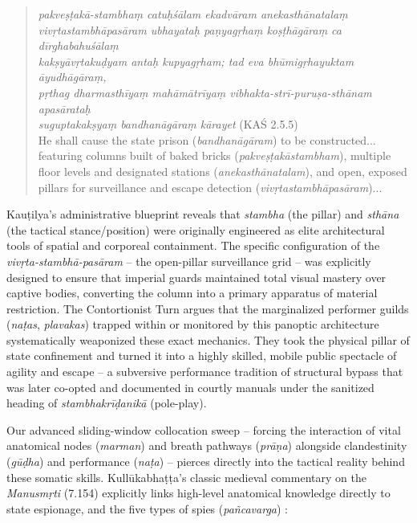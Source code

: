 \documentclass[11pt,twoside,letterpaper]{article}
\begin{document}
\begin{quote}
\textit{pakveṣṭakā-stambhaṃ catuḥśālam ekadvāram anekasthānatalaṃ \\
vivṛtastambhāpasāram ubhayataḥ paṇyagṛhaṃ koṣṭhāgāraṃ ca dīrghabahuśālaṃ\\
kakṣyāvṛtakuḍyam antaḥ kupyagṛham; tad eva bhūmigṛhayuktam āyudhāgāraṃ,\\
pṛthag dharmasthīyaṃ mahāmātrīyaṃ vibhakta-strī-puruṣa-sthānam apasārataḥ\\
suguptakakṣyaṃ bandhanāgāraṃ kārayet} (KAŚ 2.5.5) \\
He shall cause the state prison (\textit{bandhanāgāram}) to be constructed...
featuring columns built of baked bricks (\textit{pakveṣṭakāstambham}),
multiple floor levels and designated stations (\textit{anekasthānatalam}), 
and open, exposed pillars for surveillance and escape detection (\textit{vivṛtastambhāpasāram})...
\end{quote}

Kauṭilya’s administrative blueprint reveals that \textit{stambha} (the pillar) and \textit{sthāna} (the tactical stance/position) were originally engineered as elite architectural tools of spatial and corporeal containment. The specific configuration of the \textit{vivṛta-stambhā-pasāram} – the open-pillar surveillance grid – was explicitly designed to ensure that imperial guards maintained total visual mastery over captive bodies, converting the column into a primary apparatus of material restriction. The Contortionist Turn argues that the marginalized performer guilds (\textit{naṭas}, \textit{plavakas}) trapped within or monitored by this panoptic architecture systematically weaponized these exact mechanics. They took the physical pillar of state confinement and turned it into a highly skilled, mobile public spectacle of agility and escape – a subversive performance tradition of structural bypass that was later co-opted and documented in courtly manuals under the sanitized heading of \textit{stambhakrīḍanikā} (pole-play).

Our advanced sliding-window collocation sweep – forcing the interaction of vital anatomical nodes (\textit{marman}) and breath pathways (\textit{prāṇa}) alongside clandestinity (\textit{gūḍha}) and performance (\textit{naṭa}) – pierces directly into the tactical reality behind these somatic skills. Kullūkabhaṭṭa’s classic medieval commentary on the \textit{Manusmṛti} (7.154) explicitly links high-level anatomical knowledge directly to state espionage, and the five types of spies (\textit{pañcavarga}) \citep{GRETIL_vcp}:
\end{document}
